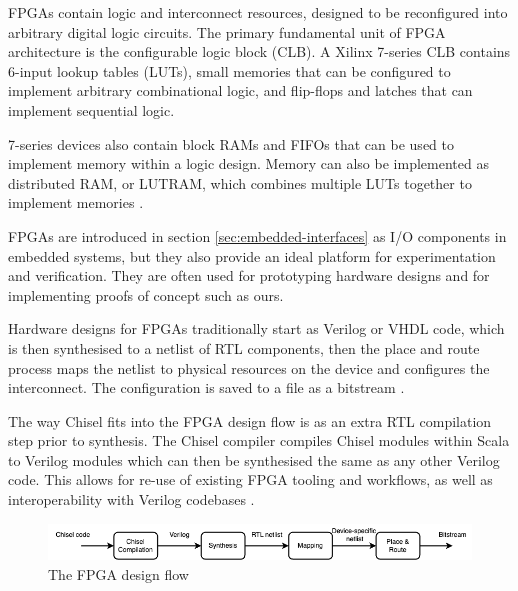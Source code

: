 FPGAs contain logic and interconnect resources, designed to be reconfigured into arbitrary digital logic circuits. The primary fundamental unit of FPGA architecture is the configurable logic block (CLB). A Xilinx 7-series CLB contains 6-input lookup tables (LUTs), small memories that can be configured to implement arbitrary combinational logic, and flip-flops and latches that can implement sequential logic.

7-series devices also contain block RAMs and FIFOs that can be used to implement memory within a logic design. Memory can also be implemented as distributed RAM, or LUTRAM, which combines multiple LUTs together to implement memories \cite{fpga_arch}.

FPGAs are introduced in section \ref{sec:embedded-interfaces} as I/O components in embedded systems, but they also provide an ideal platform for experimentation and verification. They are often used for prototyping hardware designs and for implementing proofs of concept such as ours.

Hardware designs for FPGAs traditionally start as Verilog or VHDL code, which is then synthesised to a netlist of RTL components, then the place and route process maps the netlist to physical resources on the device and configures the interconnect. The configuration is saved to a file as a bitstream \cite{vivado_design}.

The way Chisel fits into the FPGA design flow is as an extra RTL compilation step prior to synthesis. The Chisel compiler compiles Chisel modules within Scala to Verilog modules which can then be synthesised the same as any other Verilog code. This allows for re-use of existing FPGA tooling and workflows, as well as interoperability with Verilog codebases \cite{chisel}.

\begin{figure}[h!]
    \centering
    \includegraphics[width=\textwidth]{../img/design-flow.png}
    \caption{The FPGA design flow}
    \label{fig:design-flow}
\end{figure}